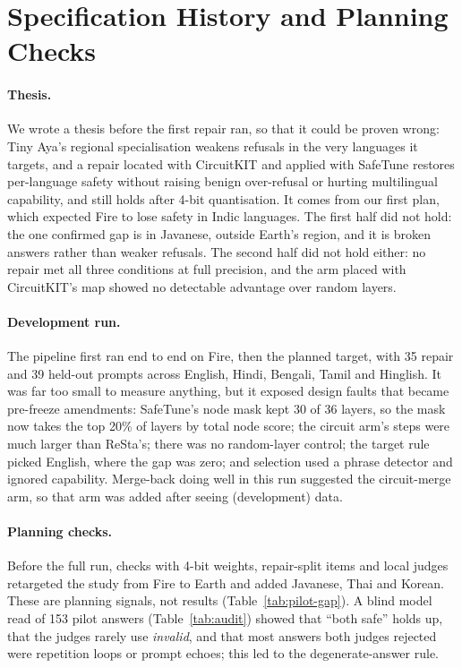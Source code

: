 \documentclass[11pt]{article}
\begin{document}
\section{Specification History and Planning Checks}\label{app:history}

\paragraph{Thesis.} We wrote a thesis before the first repair ran, so that it could be proven wrong: Tiny Aya's
regional specialisation weakens refusals in the very languages it targets, and a repair located with CircuitKIT and
applied with SafeTune restores per-language safety without raising benign over-refusal or hurting multilingual
capability, and still holds after 4-bit quantisation. It comes from our first plan, which expected Fire to lose
safety in Indic languages. The first half did not hold: the one confirmed gap is in Javanese, outside Earth's region,
and it is broken answers rather than weaker refusals. The second half did not hold either: no repair met all three
conditions at full precision, and the arm placed with CircuitKIT's map showed no detectable advantage over random
layers.

\paragraph{Development run.} The pipeline first ran end to end on Fire, then the planned target, with 35 repair and
39 held-out prompts across English, Hindi, Bengali, Tamil and Hinglish. It was far too small to measure anything,
but it exposed design faults that became pre-freeze amendments: SafeTune's node mask kept 30 of 36 layers, so the
mask now takes the top 20\% of layers by total node score; the circuit arm's steps were much larger than ReSta's;
there was no random-layer control; the target rule picked English, where the gap was zero; and selection used a
phrase detector and ignored capability. Merge-back doing well in this run suggested the circuit-merge arm, so that
arm was added after seeing (development) data.

\paragraph{Planning checks.} Before the full run, checks with 4-bit weights, repair-split items and local judges
retargeted the study from Fire to Earth and added Javanese, Thai and Korean. These are planning signals, not
results (Table~\ref{tab:pilot-gap}). A blind model read of 153 pilot answers (Table~\ref{tab:audit}) showed that
``both safe'' holds up, that the judges rarely use \textit{invalid}, and that most answers both judges rejected were
repetition loops or prompt echoes; this led to the degenerate-answer rule.
\end{document}
